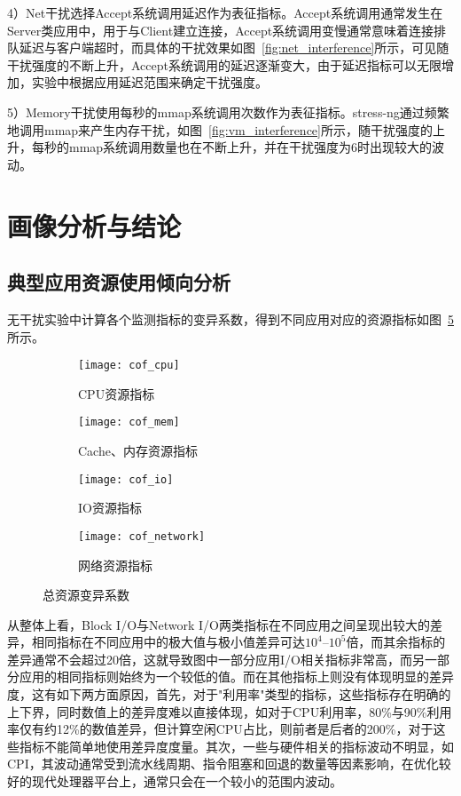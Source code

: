 4）Net干扰选择Accept系统调用延迟作为表征指标。Accept系统调用通常发生在Server类应用中，用于与Client建立连接，Accept系统调用变慢通常意味着连接排队延迟与客户端超时，而具体的干扰效果如图~\ref{fig:net_interference}所示，可见随干扰强度的不断上升，Accept系统调用的延迟逐渐变大，由于延迟指标可以无限增加，实验中根据应用延迟范围来确定干扰强度。

5）Memory干扰使用每秒的mmap系统调用次数作为表征指标。stress-ng通过频繁地调用mmap来产生内存干扰，如图~\ref{fig:vm_interference}所示，随干扰强度的上升，每秒的mmap系统调用数量也在不断上升，并在干扰强度为6时出现较大的波动。

\section{画像分析与结论}

\subsection{典型应用资源使用倾向分析}

无干扰实验中计算各个监测指标的变异系数，得到不同应用对应的资源指标如图~\ref{fig:resource_affinity}所示。

\begin{figure}[H]
    \centering
    \begin{subfigure}[b]{0.49\textwidth}
      \texttt{[image: cof\_cpu]}
      \caption{CPU资源指标}
      \label{fig:cof_cpu}
    \end{subfigure}
    \begin{subfigure}[b]{0.49\textwidth}
        \texttt{[image: cof\_mem]}
        \caption{Cache、内存资源指标}
        \label{fig:cof_mem}
    \end{subfigure}
    \begin{subfigure}[b]{0.49\textwidth}
        \texttt{[image: cof\_io]}
        \caption{IO资源指标}
        \label{fig:cof_mem}
    \end{subfigure}
    \begin{subfigure}[b]{0.49\textwidth}
        \texttt{[image: cof\_network]}
        \caption{网络资源指标}
        \label{fig:cof_mem}
    \end{subfigure}
\caption{总资源变异系数}
\label{fig:resource_affinity}
\end{figure}

从整体上看，Block I/O与Network I/O两类指标在不同应用之间呈现出较大的差异，相同指标在不同应用中的极大值与极小值差异可达$10^4$--$10^5$倍，而其余指标的差异通常不会超过20倍，这就导致图中一部分应用I/O相关指标非常高，而另一部分应用的相同指标则始终为一个较低的值。而在其他指标上则没有体现明显的差异度，这有如下两方面原因，首先，对于"利用率"类型的指标，这些指标存在明确的上下界，同时数值上的差异度难以直接体现，如对于CPU利用率，80\%与90\%利用率仅有约12\%的数值差异，但计算空闲CPU占比，则前者是后者的200\%，对于这些指标不能简单地使用差异度度量。其次，一些与硬件相关的指标波动不明显，如CPI，其波动通常受到流水线周期、指令阻塞和回退的数量等因素影响，在优化较好的现代处理器平台上，通常只会在一个较小的范围内波动。

